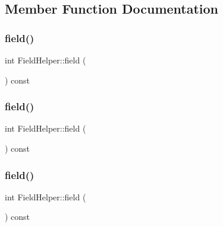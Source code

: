 \subsection{Member Function Documentation}
\mbox{\label{class_field_helper_af2959e142813205aeeb4d2ad27430ad3}} 
\subsubsection{\texorpdfstring{field()}{field()}\hspace{0.1cm}{\footnotesize\ttfamily [1/3]}}
{\footnotesize\ttfamily int Field\+Helper\+::field (\begin{DoxyParamCaption}{ }\end{DoxyParamCaption}) const\hspace{0.3cm}{\ttfamily [inline]}}

\mbox{\label{class_field_helper_af2959e142813205aeeb4d2ad27430ad3}} 
\subsubsection{\texorpdfstring{field()}{field()}\hspace{0.1cm}{\footnotesize\ttfamily [2/3]}}
{\footnotesize\ttfamily int Field\+Helper\+::field (\begin{DoxyParamCaption}{ }\end{DoxyParamCaption}) const\hspace{0.3cm}{\ttfamily [inline]}}

\mbox{\label{class_field_helper_af2959e142813205aeeb4d2ad27430ad3}} 
\subsubsection{\texorpdfstring{field()}{field()}\hspace{0.1cm}{\footnotesize\ttfamily [3/3]}}
{\footnotesize\ttfamily int Field\+Helper\+::field (\begin{DoxyParamCaption}{ }\end{DoxyParamCaption}) const\hspace{0.3cm}{\ttfamily [inline]}}



